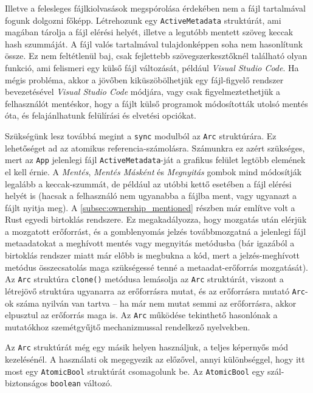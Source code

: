 Illetve a felesleges fájlkiolvasások megspórolása érdekében nem a fájl tartalmával fogunk dolgozni főképp.
Létrehozunk egy \texttt{ActiveMetadata} struktúrát, ami magában tárolja a fájl elérési helyét,
illetve a legutóbb mentett szöveg keccak hash szummáját.
A fájl valós tartalmával tulajdonképpen soha nem hasonlítunk össze.
Ez nem feltétlenül baj, csak fejlettebb szövegszerkesztőknél található olyan funkció, ami felismeri
egy külső fájl változását, például \textit{Visual Studio Code}.
Ha mégis probléma, akkor a jövőben kiküszöbölhetjük egy fájl-figyelő rendszer bevezetésével \textit{Visual Studio Code} módjára,
vagy csak figyelmeztethetjük a felhasználót mentéskor, hogy a fájlt külső programok módosították utolsó mentés óta,
és felajánlhatunk felülírási és elvetési opciókat.

Szükségünk lesz továbbá megint a \texttt{sync} modulból az \texttt{Arc} struktúrára.
Ez lehetőséget ad az atomikus referencia-számolásra.
Számunkra ez azért szükséges, mert az \texttt{App} jelenlegi fájl \texttt{ActiveMetadata}-ját
a grafikus felület legtöbb elemének el kell érnie.
A \textit{Mentés}, \textit{Mentés Másként} és \textit{Megnyitás} gombok mind módosítják legalább a keccak-szummát,
de például az utóbbi kettő esetében a fájl elérési helyét is (hacsak a felhasználó nem ugyanabba a fájlba ment,
vagy ugyanazt a fájlt nyitja meg).
A \ref{subsec:ownership_mentioned} részben már említve volt a Rust egyedi birtoklás rendszere.
Ez megakadályozza, hogy mozgatás után elérjük a mozgatott erőforrást, és a gomblenyomás jelzés
továbbmozgatná a jelenlegi fájl metaadatokat a meghívott mentés vagy megnyitás metódusba
(bár igazából a birtoklás rendszer miatt már előbb is megbukna a kód, mert a jelzés-meghívott metódus
összecsatolás maga szükségessé tenné a metaadat-erőforrás mozgatását).
Az \texttt{Arc} struktúra \texttt{clone()} metódusa lemásolja az \texttt{Arc} struktúrát,
viszont a létrejövő struktúra ugyanarra az erőforrásra mutat, és az erőforrásra mutató \texttt{Arc}-ok
száma nyilván van tartva -- ha már nem mutat semmi az erőforrásra, akkor elpusztul az erőforrás maga is.
Az \texttt{Arc} működése tekinthető hasonlónak a mutatókhoz szemétgyűjtő mechanizmussal rendelkező nyelvekben.

Az \texttt{Arc} struktúrát még egy másik helyen használjuk, a teljes képernyős mód kezelésénél.
A használati ok megegyezik az előzővel, annyi különbséggel, hogy itt most egy \texttt{AtomicBool} struktúrát csomagolunk be.
Az \texttt{AtomicBool} egy szál-biztonságos \texttt{boolean} változó.

